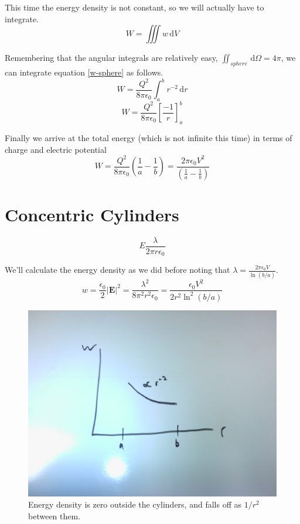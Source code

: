 \documentclass[10pt,a4paper]{article}
\begin{document}
This time the energy density is not constant, so we will actually have to integrate.
\begin{equation}
W=\iiint w \,\mathrm{d}V
\end{equation}

Remembering that the angular integrals are relatively easy, $\iint_{sphere}\,\mathrm{d}\Omega=4\pi$, we can integrate equation \ref{w-sphere} as follows.
\begin{equation}
W=\frac{Q^2}{8\pi\epsilon_0}\int_a^b r^{-2}\,\mathrm{d}r
\end{equation}
\begin{equation}
W=\frac{Q^2}{8\pi\epsilon_0}\left[\frac{-1}{r}\right]_a^b
\end{equation}

Finally we arrive at the total energy (which is not infinite this time) in terms of charge and electric potential
\begin{equation}
W
=\frac{Q^2}{8\pi\epsilon_0}\left(\frac{1}{a}-\frac{1}{b}\right)
=\frac{2\pi\epsilon_0V^2}{\left(\frac{1}{a}-\frac{1}{b}\right)}
\end{equation}

\section{Concentric Cylinders}
\begin{equation}
E\frac{\lambda}{2\pi r\epsilon_0}
\end{equation}

We'll calculate the energy density as we did before noting that $\lambda=\frac{2\pi\epsilon_0V}{\ln(b/a)}$.
\begin{equation}\label{w-cylinder}
w
=\frac{\epsilon_0}{2}|\mathbf{E}|^2
=\frac{\lambda^2}{8\pi^2r^2\epsilon_0}
=\frac{\epsilon_0V^2}{2r^2\ln^2(b/a)}
\end{equation}

\begin{figure}[h]
\centering
\includegraphics[scale=.1]{Jackson1-8-cylinder.jpg}
\caption{Energy density is zero outside the cylinders, and falls off as $1/r^2$ between them.}
\end{figure}
\end{document}
